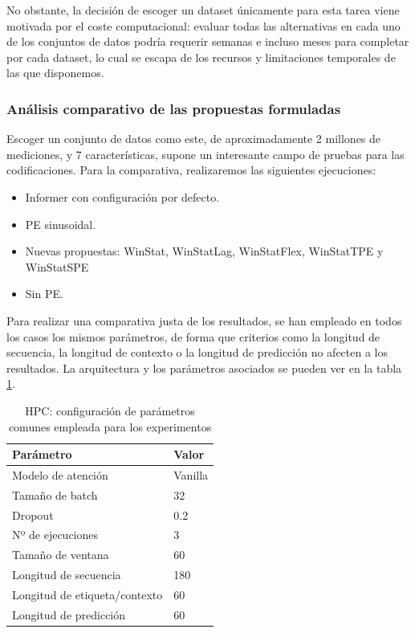 No obstante, la decisión de escoger un dataset únicamente para esta tarea viene motivada por el coste computacional: evaluar todas las alternativas en cada uno de los conjuntos de datos podría requerir semanas e incluso meses para completar por cada dataset, lo cual se escapa de los recursos y limitaciones temporales de las que disponemos.

\subsubsection{Análisis comparativo de las propuestas formuladas}

Escoger un conjunto de datos como este, de aproximadamente 2 millones de mediciones, y 7 características, supone un interesante campo de pruebas para las codificaciones. Para la comparativa, realizaremos las siguientes ejecuciones:

\begin{itemize}
	\item Informer con configuración por defecto.
	\item PE sinusoidal.
	\item Nuevas propuestas: WinStat, WinStatLag, WinStatFlex,  WinStatTPE y WinStatSPE	
	\item Sin PE.
\end{itemize}

Para realizar una comparativa justa de los resultados, se han empleado en todos los casos los mismos parámetros, de forma que criterios como la longitud de secuencia, la longitud de contexto o la longitud de predicción no afecten a los resultados. La arquitectura y los parámetros asociados se pueden ver en la tabla \ref{ajustes}.

\begin{table}[!ht]
	\centering
	\begin{tabular}{l|l}
		\toprule
		Parámetro & Valor \\
		\midrule
		{Modelo de atención} & Vanilla \\
		{Tamaño de batch} & 32 \\
		{Dropout} & 0.2 \\
		{Nº de ejecuciones} & 3 \\
		{Tamaño de ventana} & 60 \\
		{Longitud de secuencia} & 180 \\
		{Longitud de etiqueta/contexto} & 60 \\
		{Longitud de predicción} & 60 \\
		\bottomrule
	\end{tabular}
	\caption{HPC: configuración de parámetros comunes empleada para los experimentos}
	\label{ajustes}
\end{table}

